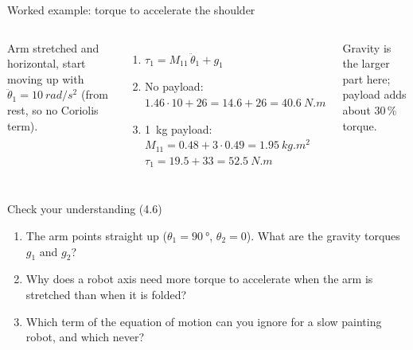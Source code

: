 \documentclass[aspectratio=169,10pt]{beamer}
\begin{document}
\begin{frame}[t]{Worked example: torque to accelerate the shoulder}
\begin{columns}[T,onlytextwidth]
\small
Arm stretched and horizontal, start moving up with $\ddot\theta_1=\SI{10}{rad/s^2}$ (from rest, so no Coriolis term).
\begin{enumerate}
\item $\tau_1 = M_{11}\,\ddot\theta_1 + g_1$
\item No payload: $1.46\cdot10+26=14.6+26=\SI{40.6}{N.m}$
\item \SI{1}{kg} payload: $M_{11}=0.48+3\cdot0.49=\SI{1.95}{kg.m^2}$\\
$\tau_1=19.5+33=\SI{52.5}{N.m}$
\end{enumerate}
\begin{keybox}
Gravity is the larger part here; payload adds about 30\,\% torque.
\end{keybox}
\end{columns}
\end{frame}

\begin{frame}[t]{Check your understanding (4.6)}
\begin{keybox}
\begin{enumerate}\small
\item The arm points straight up ($\theta_1=\SI{90}{\degree}$, $\theta_2=0$). What are the gravity torques $g_1$ and $g_2$?
\item Why does a robot axis need more torque to accelerate when the arm is stretched than when it is folded?
\item Which term of the equation of motion can you ignore for a slow painting robot, and which never?
\end{enumerate}
\end{keybox}
\end{frame}
\end{document}
